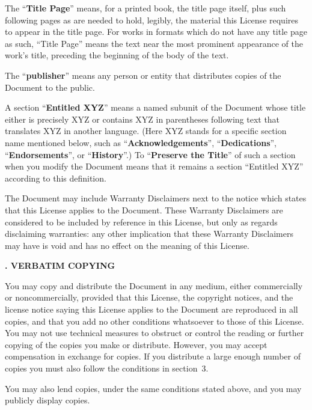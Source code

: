 The ``\textbf{Title Page}'' means, for a printed book, the title page itself,
plus such following pages as are needed to hold, legibly, the material
this License requires to appear in the title page.  For works in
formats which do not have any title page as such, ``Title Page'' means
the text near the most prominent appearance of the work's title,
preceding the beginning of the body of the text.

The ``\textbf{publisher}'' means any person or entity that distributes
copies of the Document to the public.

A section ``\textbf{Entitled XYZ}'' means a named subunit of the Document whose
title either is precisely XYZ or contains XYZ in parentheses following
text that translates XYZ in another language.  (Here XYZ stands for a
specific section name mentioned below, such as ``\textbf{Acknowledgements}'',
``\textbf{Dedications}'', ``\textbf{Endorsements}'', or ``\textbf{History}''.)
To ``\textbf{Preserve the Title}''
of such a section when you modify the Document means that it remains a
section ``Entitled XYZ'' according to this definition.

The Document may include Warranty Disclaimers next to the notice which
states that this License applies to the Document.  These Warranty
Disclaimers are considered to be included by reference in this
License, but only as regards disclaiming warranties: any other
implication that these Warranty Disclaimers may have is void and has
no effect on the meaning of this License.


\begin{flushleft}
    {\large\bfseries{}. VERBATIM COPYING\par}
\end{flushleft}

You may copy and distribute the Document in any medium, either
commercially or noncommercially, provided that this License, the
copyright notices, and the license notice saying this License applies
to the Document are reproduced in all copies, and that you add no other
conditions whatsoever to those of this License.  You may not use
technical measures to obstruct or control the reading or further
copying of the copies you make or distribute.  However, you may accept
compensation in exchange for copies.  If you distribute a large enough
number of copies you must also follow the conditions in section~3.

You may also lend copies, under the same conditions stated above, and
you may publicly display copies.



